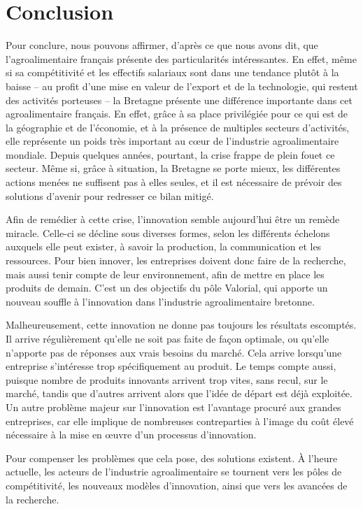 \documentclass[a4paper,12pt]{report}
\begin{document}
\chapter*{Conclusion}
	Pour conclure, nous pouvons affirmer, d’après ce que nous avons dit, que l’agroalimentaire français présente des particularités intéressantes. En effet, même si sa compétitivité et les effectifs salariaux sont dans une tendance plutôt à la baisse -- au profit d’une mise en valeur de l’export et de la technologie, qui restent des activités porteuses -- la Bretagne présente une différence importante dans cet agroalimentaire français. En effet, grâce à sa place privilégiée pour ce qui est de la géographie et de l’économie, et à la présence de multiples secteurs d’activités, elle représente un poids très important au cœur de l’industrie agroalimentaire mondiale. Depuis quelques années, pourtant, la crise frappe de plein fouet ce secteur. Même si, grâce à situation, la Bretagne se porte mieux, les différentes actions menées ne suffisent pas à elles seules, et il est nécessaire de prévoir des solutions d’avenir pour redresser ce bilan mitigé.
  
    Afin de remédier à cette crise, l’innovation semble aujourd’hui être un remède miracle.  Celle-ci se décline sous diverses formes, selon les différents échelons auxquels elle peut exister, à savoir la production, la communication et les ressources. Pour bien innover, les entreprises doivent donc faire de la recherche, mais aussi tenir compte de leur environnement, afin de mettre en place les produits de demain. C'est un des objectifs du pôle Valorial, qui apporte un nouveau souffle à l'innovation dans l'industrie agroalimentaire bretonne.

    Malheureusement, cette innovation ne donne pas toujours les résultats escomptés. Il arrive régulièrement qu’elle ne soit pas faite de façon optimale, ou qu’elle n’apporte pas de réponses aux vrais besoins du marché. Cela arrive lorsqu’une entreprise s’intéresse trop spécifiquement au produit. Le temps compte aussi, puisque nombre de produits innovants arrivent trop vites, sans recul, sur le marché, tandis que d’autres arrivent alors que l'idée de départ est déjà exploitée. Un autre problème majeur sur l’innovation est l’avantage procuré aux grandes entreprises, car elle implique de nombreuses contreparties à l’image du coût élevé nécessaire à la mise en œuvre d’un processus d’innovation.
    
    Pour compenser les problèmes que cela pose, des solutions existent. À l’heure actuelle, les acteurs de l’industrie agroalimentaire se tournent vers les pôles de compétitivité, les nouveaux modèles d’innovation, ainsi que vers les avancées de la recherche.
    
\end{document}
